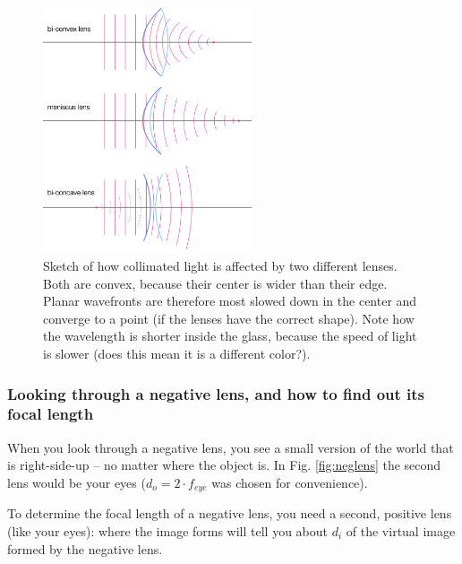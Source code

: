 \documentclass[a4paper]{report}
\begin{document}
	\begin{figure}[h]
		\center
		\includegraphics[width=0.55\textwidth]{figures/lens_wave_picture.png}
		\captionsetup{width=0.6\textwidth}
		\caption{Sketch of how collimated light is affected by two different lenses. Both are convex, because their center is wider than their edge. Planar wavefronts are therefore most slowed down in the center and converge to a point (if the lenses have the correct shape). Note how the wavelength is shorter inside the glass, because the speed of light is slower (does this mean it is a different color?).}
		\label{fig:lens_wave}
	\end{figure}

	
	\subsubsection{Looking through a negative lens, and how to find out its focal length}
	When you look through a negative lens, you see a small version of the world that is right-side-up -- no matter where the object is. In Fig. \ref{fig:neglens} the second lens would be your eyes ($d_o = 2\cdot f_{eye}$ was chosen for convenience).

	
	To determine the focal length of a negative lens, you need a second, positive lens (like your eyes): where the image forms will tell you about $d_i$ of the virtual image formed by the negative lens. 
\end{document}
